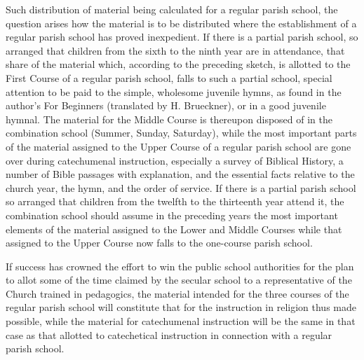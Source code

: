 Such distribution of material being calculated for a regular parish school, the question arises how the material is to be distributed where the establishment of a regular parish school has proved inexpedient. If there is a partial parish school, so arranged that children from the sixth to the ninth year are in attendance, that share of the material which, according to the preceding sketch, is allotted to the First Course of a regular parish school, falls to such a partial school, special attention to be paid to the simple, wholesome juvenile hymns, as found in the author's For Beginners (translated by H. Brueckner), or in a good juvenile hymnal. The material for the Middle Course is thereupon disposed of in the combination
school (Summer, Sunday, Saturday), while the most important parts of the material assigned to the Upper Course of a regular parish school are gone over during catechumenal instruction, especially a survey of Biblical History, a number of Bible passages with explanation, and the essential facts relative to the church year, the hymn, and the order of service. If there is a partial parish school so arranged that children from the twelfth to the thirteenth year attend it, the combination school should assume in the preceding years the most important elements of the material assigned to the Lower and Middle Courses while that assigned to the Upper Course now falls to the one-course parish school.

If success has crowned the effort to win the public school authorities for the plan to allot some of the time claimed by the secular school to a representative of the Church trained in pedagogics, the material intended for the three courses of the regular parish school will constitute that for the instruction in religion thus made possible, while the material for catechumenal instruction will be the same in that case as that allotted to catechetical instruction in connection with a regular parish school.

